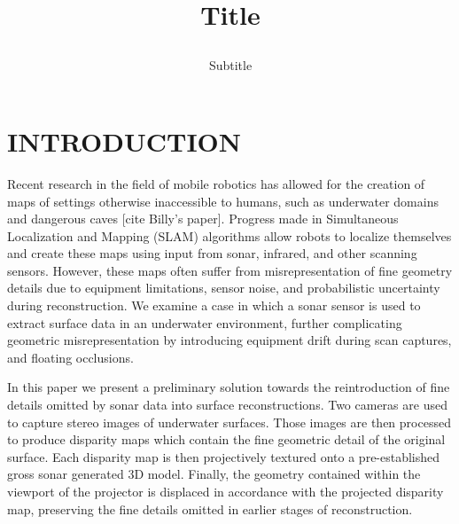 \documentclass[a4paper,twoside]{article}
\begin{document}
\title{Title  \subtitle{Subtitle} }

\author{
}



\onecolumn \maketitle \normalsize \vfill

\section{\uppercase{Introduction}}
\label{sec:introduction}


\noindent Recent research in the field of mobile robotics has allowed for the creation of maps of settings otherwise inaccessible to humans, such as underwater domains and dangerous caves [cite Billy's paper]. Progress made in Simultaneous Localization and Mapping (SLAM) algorithms allow robots to localize themselves and create these maps using input from sonar, infrared, and other scanning sensors. However, these maps often suffer from misrepresentation of fine geometry details due to equipment limitations, sensor noise, and probabilistic uncertainty during reconstruction. We examine a case in which a sonar sensor is used to extract surface data in an underwater environment, further complicating geometric misrepresentation by introducing equipment drift during scan captures, and floating occlusions.

In this paper we present a preliminary solution towards the reintroduction of fine details omitted by sonar data into surface reconstructions.  
Two cameras are used to capture stereo images of underwater surfaces.
Those images are then processed to produce disparity maps which contain the fine geometric detail of the original surface.
Each disparity map is then projectively textured onto a pre-established gross sonar generated 3D model. Finally, the geometry contained within the viewport of the projector is displaced in accordance with the projected disparity map, preserving the fine details omitted in earlier stages of reconstruction.
\end{document}
